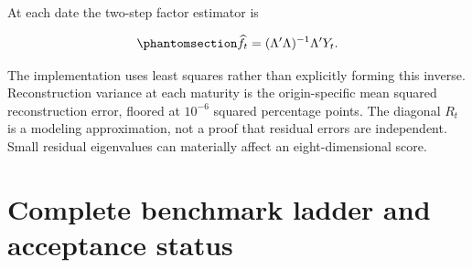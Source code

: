 \documentclass[
  12pt,
  letterpaper,
  DIV=11,
  numbers=noendperiod]{scrreprt}
\begin{document}
At each date the two-step factor estimator is

\begin{equation}\protect\phantomsection\label{eq-extraction}{
\widehat f_t=(\Lambda'\Lambda)^{-1}\Lambda'Y_t.
}\end{equation}

The implementation uses least squares rather than explicitly forming
this inverse. Reconstruction variance at each maturity is the
origin-specific mean squared reconstruction error, floored at
\(10^{-6}\) squared percentage points. The diagonal \(R_t\) is a
modeling approximation, not a proof that residual errors are
independent. Small residual eigenvalues can materially affect an
eight-dimensional score.

\section{Complete benchmark ladder and acceptance
status}\label{complete-benchmark-ladder-and-acceptance-status}
\end{document}
